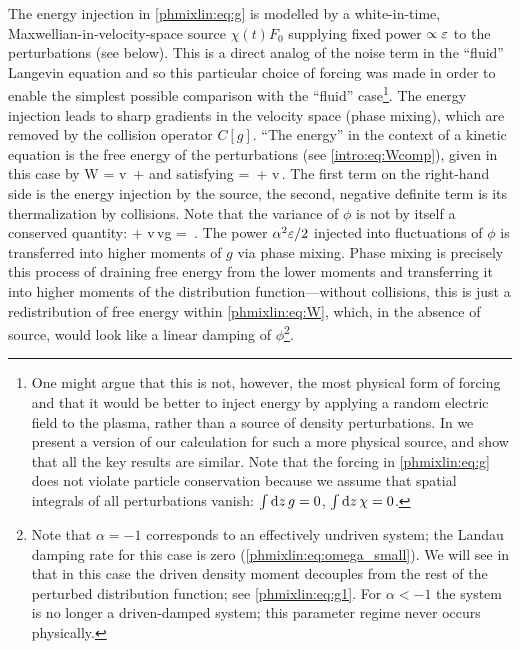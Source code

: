 The energy injection in \eqref{phmixlin:eq:g} is modelled by a white-in-time, Maxwellian-in-velocity-space 
source $\chi(t) F_0$ supplying fixed power $\propto \varepsilon$ to the perturbations (see below). 
This is a direct analog of the noise term in the ``fluid'' Langevin equation
and so this particular choice of forcing was made in order to enable the simplest possible
comparison with the ``fluid'' case\footnote{One might argue that this is not, however, 
the most physical form of forcing and that it would be better to inject energy 
by applying a random electric field to the plasma, rather than a source of density
perturbations. In  we present a version of our calculation for such a
more physical source, and show that all the key results are similar. Note that the forcing
in \eqref{phmixlin:eq:g} does not violate particle conservation because we assume that
spatial integrals of all perturbations vanish:
$\int{\rm d} z\, g = 0$, $\int{\rm d} z\,\chi = 0$.}.
The energy injection leads to sharp gradients in the velocity space (phase mixing), 
which are removed by the collision operator $C[g]$. 
``The energy'' in the context of a kinetic equation is the free energy of the 
perturbations \cite{schekochihin08,tome} (see \eqref{intro:eq:Wcomp}), given in this case by 
\beq
W = \int\rmd v\, + \frac{\la\phi^2\ra}{2\alpha}
\label{phmixlin:eq:W}
\eeq    
and satisfying 
\beq
{} = \,\eps + \int\rmd v\,.
\label{phmixlin:eq:Wbalance}
\eeq
The first term on the right-hand side is the energy injection by the source, 
the second, negative definite term is its thermalization by collisions.
Note that the variance of $\phi$ is not by itself a conserved quantity:
\beq
{} + \alpha\lt\la\phi{}\int\rmd v\,vg\rt\ra 
= \,\eps.
\label{phmixlin:eq:phisq}
\eeq
The power $\alpha^2\varepsilon/2$ injected into fluctuations of $\phi$ is 
transferred into higher moments of $g$ via phase mixing. 
Phase mixing is precisely this process of draining free energy 
from the lower moments and transferring it into higher moments of the 
distribution function---without collisions, this is just a redistribution 
of free energy within \eqref{phmixlin:eq:W}, which, in the absence of source, 
would look like a linear damping of $\phi$\footnote{Note that 
$\alpha=-1$ corresponds to an effectively undriven system; 
the Landau damping rate for this case is zero (\eqref{phmixlin:eq:omega_small}).
We will see in  that in this case the 
driven density moment decouples from the rest of the perturbed 
distribution function; see \eqref{phmixlin:eq:g1}. For $\alpha<-1$ the system 
is no longer a driven-damped system; this parameter regime never occurs 
physically.}.
 
